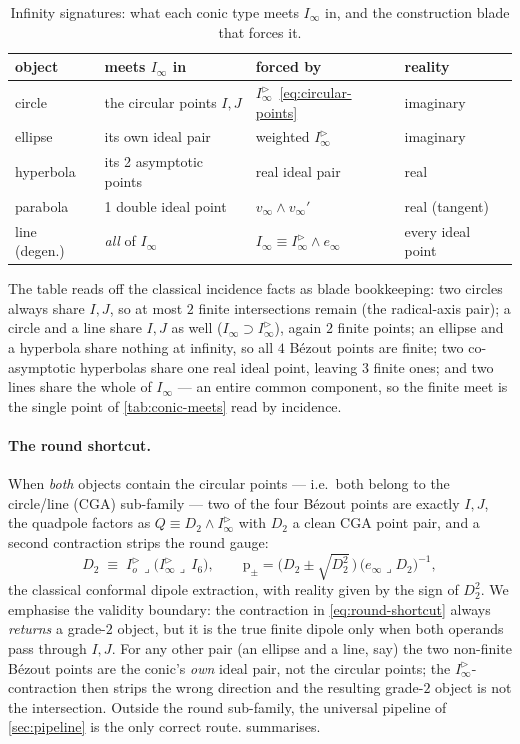 \documentclass{birkjour}
\theoremstyle{definition}
\theoremstyle{remark}
\newcommand{\einf}{e_\infty}
\newcommand{\Iod}{I_o^{\triangleright}}      %
\newcommand{\Iinfd}{I_\infty^{\triangleright}}%
\newcommand{\Iinf}{I_\infty}
\newcommand{\joinp}{\wedge}
\begin{document}
\begin{table}[H]
\centering
\caption{Infinity signatures: what each conic type meets $\Iinf$ in, and the
construction blade that forces it.}
\label{tab:infinity-signature}
\small
\begin{tabular}{@{}llll@{}}
\toprule
object & meets $\Iinf$ in & forced by & reality \\
\midrule
circle    & the circular points $I,J$ & $\Iinfd$~\eqref{eq:circular-points} & imaginary \\
ellipse   & its own ideal pair        & weighted $\Iinfd$ & imaginary \\
hyperbola & its 2 asymptotic points   & real ideal pair & real \\
parabola  & 1 double ideal point      & $v_\infty\joinp v_\infty'$ & real (tangent) \\
line (degen.) & \emph{all} of $\Iinf$ & $\Iinf\equiv\Iinfd\joinp\einf$ & every ideal point \\
\bottomrule
\end{tabular}
\end{table}

The table reads off the classical incidence facts as blade bookkeeping: two
circles always share $I,J$, so at most $2$ finite intersections remain (the
radical-axis pair); a circle and a line share $I,J$ as well ($\Iinf \supset
\Iinfd$), again $2$ finite points; an ellipse and a hyperbola share nothing
at infinity, so all $4$ B\'ezout points are finite; two co-asymptotic
hyperbolas share one real ideal point, leaving $3$ finite ones; and two
lines share the whole of $\Iinf$ --- an entire common component, so the
finite meet is the single point of \cref{tab:conic-meets} read by incidence.

\paragraph{The round shortcut.}
When \emph{both} objects contain the circular points --- i.e.\ both belong to
the circle/line (CGA) sub-family --- two of the four B\'ezout points are
exactly $I,J$, the quadpole factors as
$Q \equiv D_2\joinp\Iinfd$ with $D_2$ a clean CGA point pair, and a second
contraction strips the round gauge:
\begin{equation}\label{eq:round-shortcut}
  D_2 \;\equiv\; \Iod\lrcorner\big(\Iinfd\lrcorner\, I_6\big),
  \qquad
  \mathrm{p}_\pm = \big(D_2 \pm \sqrt{D_2^2}\,\big)\,
                   \big(\einf\lrcorner D_2\big)^{-1},
\end{equation}
the classical conformal dipole extraction, with reality given by the sign of
$D_2^2$. We emphasise the validity boundary: the contraction in
\cref{eq:round-shortcut} always \emph{returns} a grade-$2$ object, but it is
the true finite dipole only when both operands pass through $I,J$. For any
other pair (an ellipse and a line, say) the two non-finite B\'ezout points
are the conic's \emph{own} ideal pair, not the circular points; the
$\Iinfd$-contraction then strips the wrong direction and the resulting
grade-$2$ object is not the intersection. Outside the round sub-family, the
universal pipeline of \cref{sec:pipeline} is the only correct route.
 summarises.
\end{document}
